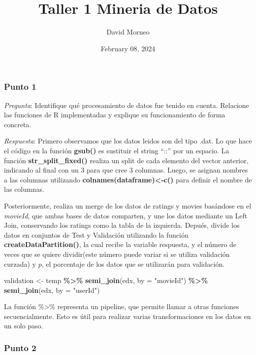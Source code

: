 \documentclass[
]{article}
\title{Taller 1 Mineria de Datos}
\author{David Morneo}
\date{February 08, 2024}
\newenvironment{Shaded}{\begin{snugshade}}{\end{snugshade}}
\newcommand{\AttributeTok}[1]{\textcolor[rgb]{0.13,0.29,0.53}{#1}}
\newcommand{\FunctionTok}[1]{\textcolor[rgb]{0.13,0.29,0.53}{\textbf{#1}}}
\newcommand{\NormalTok}[1]{#1}
\newcommand{\OtherTok}[1]{\textcolor[rgb]{0.56,0.35,0.01}{#1}}
\newcommand{\SpecialCharTok}[1]{\textcolor[rgb]{0.81,0.36,0.00}{\textbf{#1}}}
\newcommand{\StringTok}[1]{\textcolor[rgb]{0.31,0.60,0.02}{#1}}
\begin{document}
\maketitle

\subsubsection{Punto 1}\label{punto-1}

\emph{Pregunta}: Identifique qué procesamiento de datos fue tenido en
cuenta. Relacione las funciones de R implementadas y explique su
funcionamiento de forma concreta.

\emph{Respuesta}: Primero observamos que los datos leidos son del tipo
.dat. Lo que hace el código en la función \textbf{gsub()} es sustituir
el string ``::'' por un espacio. La función \textbf{str\_split\_fixed()}
realiza un split de cada elemento del vector anterior, indicando al
final con un 3 para que cree 3 columnas. Luego, se asignan nombres a las
columnas utilizando \textbf{colnames(dataframe)\textless-c()} para
definir el nombre de las columnas.

Posteriormente, realiza un merge de los datos de ratings y movies
basándose en el \emph{movieId}, que ambas bases de datos comparten, y
une los datos mediante un Left Join, conservando los ratings como la
tabla de la izquierda. Depués, divide los datos en conjuntos de Test y
Validación utilizando la función \textbf{createDataPartition()}, la cual
recibe la variable respuesta, y el número de veces que se quiere
dividir(este número puede variar si se utiliza validación curzada) y
\(p\), el porcentaje de los datos que se utilizarán para validación.

\begin{Shaded}
\begin{Highlighting}[]
\NormalTok{validation }\OtherTok{\textless{}{-}}\NormalTok{ temp }\SpecialCharTok{\%\textgreater{}\%} 
     \FunctionTok{semi\_join}\NormalTok{(edx, }\AttributeTok{by =} \StringTok{"movieId"}\NormalTok{) }\SpecialCharTok{\%\textgreater{}\%}
     \FunctionTok{semi\_join}\NormalTok{(edx, }\AttributeTok{by =} \StringTok{"userId"}\NormalTok{)}
\end{Highlighting}
\end{Shaded}

La función \%\textgreater\% representa un pipeline, que permite llamar a
otras funciones secuencialmente. Esto es útil para realizar varias
transformaciones en los datos en un solo paso.

\subsubsection{Punto 2}\label{punto-2}
\end{document}
